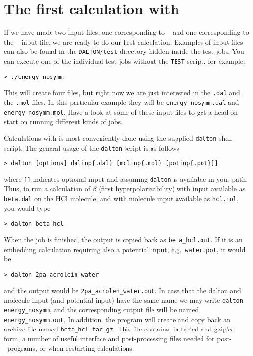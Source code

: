 \section{The first calculation with {\dalton}}\label{sec:firstcalc}

If we have made two input files, one corresponding to
\dalinp\  and one corresponding to the \molinp\
 input file, we
are ready to do our first calculation. Examples of input files can
also be found in the \verb|DALTON/test| directory hidden inside the
test jobs. You can execute one of the individual test jobs
without the \verb|TEST| script, for example:
\begin{verbatim}
> ./energy_nosymm
\end{verbatim}
This will create four files, but right now we are just interested in
the \verb|.dal| and the \verb|.mol| files. In this particular example
they will be \verb|energy_nosymm.dal| and
\verb|energy_nosymm.mol|. Have a look at some of these input files to
get a head-on start on running different kinds of {\dalton} jobs.

Calculations with {\dalton} is most conveniently done using the
supplied \verb|dalton| shell script.
The general usage of the \verb|dalton| script is as follows
\begin{verbatim}
> dalton [options] dalinp{.dal} [molinp{.mol} [potinp{.pot}]]
\end{verbatim}
where \verb|[]| indicates optional input and assuming \verb|dalton| is
available in your path.
Thus, to run a calculation of $\beta$ (first
hyperpolarizability) 
with input available as \verb|beta.dal| on the HCl molecule, and with
molecule input available as \verb|hcl.mol|, you would type
\begin{verbatim}
> dalton beta hcl
\end{verbatim}
When the job is
finished, the output is copied back as \verb|beta_hcl.out|. If it is an embedding
calculation requiring also a potential input, e.g.\ \verb|water.pot|, it would be
\begin{verbatim}
> dalton 2pa acrolein water
\end{verbatim}
and the output would be \verb|2pa_acrolen_water.out|. In case that the dalton and molecule
input (and potential input) have the same name we may write \verb|dalton energy_nosymm|,
and the corresponding output file will be named \verb|energy_nosymm.out|. In addition, the 
program will create and copy back an archive file named \verb|beta_hcl.tar.gz|. This file 
contains, in tar'ed and gzip'ed form, a number of useful interface and
post-processing files needed for post-\dalton\ programs, or when
restarting calculations.

